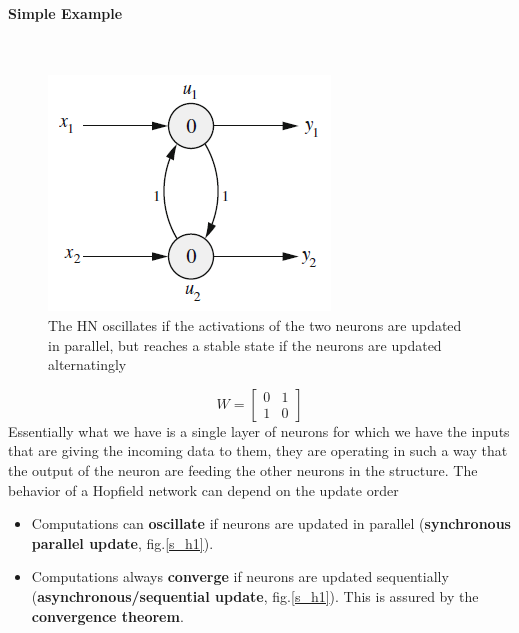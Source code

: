 \documentclass{article}
\begin{document}
\paragraph{Simple Example}\mbox{}\\
\begin{figure}[H]
    \centering
    \includegraphics[scale=0.7]{images/simple_hop.png}
    \caption{The HN oscillates if the activations of the two neurons are updated in parallel,
    but reaches a stable state if the neurons are updated alternatingly}
    \label{fig:s_h1}
\end{figure}
\[
    W=
    \begin{bmatrix}
         0 & 1 \\
         1 & 0
    \end{bmatrix}
\]
Essentially what we have is a single layer of neurons for which we have the inputs that are
giving the incoming data to them, they are operating in such a way that the output of the neuron
are feeding the other neurons in the structure.
\newline\newline
The behavior of a Hopfield network can depend on the update order
\begin{itemize}
    \item Computations can \textbf{oscillate} if neurons are updated in parallel (\textbf{synchronous parallel update}, fig.\ref{s_h1}).
    \item Computations always \textbf{converge} if neurons are updated sequentially (\textbf{asynchronous/sequential update}, fig.\ref{s_h1}).
    This is assured by the \textbf{convergence theorem}.
\end{itemize}
\end{document}
